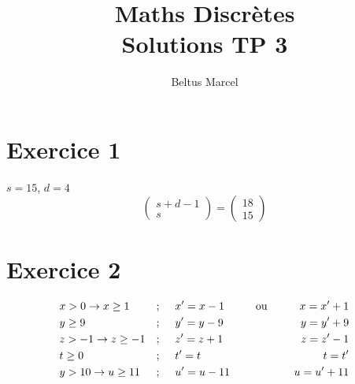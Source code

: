 \documentclass[fontsize=10pt]{article}
\title{\textbf{Maths Discrètes}\\ Solutions TP 3}
\author{Beltus Marcel}
\date{}
\begin{document}
\maketitle %


\section*{Exercice 1}
$s = 15$, \hspace{1cm}$d = 4$\\
$$\begin{pmatrix}
s + d -1\\
s
\end{pmatrix}
=
\begin{pmatrix}
18\\
 15
\end{pmatrix}$$
\section*{Exercice 2}
\begin{align*}
&x > 0 \rightarrow x \geq 1 \hspace{0.5cm} &;\hspace{0.5cm}&x' = x-1 \hspace{1cm}\text{ou} \hspace{0.5cm}&x = x'+1 \\
&y \geq 9 &; \hspace{0.5cm}&y' = y-9 & y = y'+9\\
&z>-1 \rightarrow z\geq -1&; \hspace{0.5cm}&z' = z+1 & z = z'-1\\
&t \geq 0 &; \hspace{0.5cm}&t' = t & t = t'\\
&y > 10 \rightarrow u \geq 11 &; \hspace{0.5cm}&u' = u-11 & u = u' +11
\end{align*}
\end{document}
